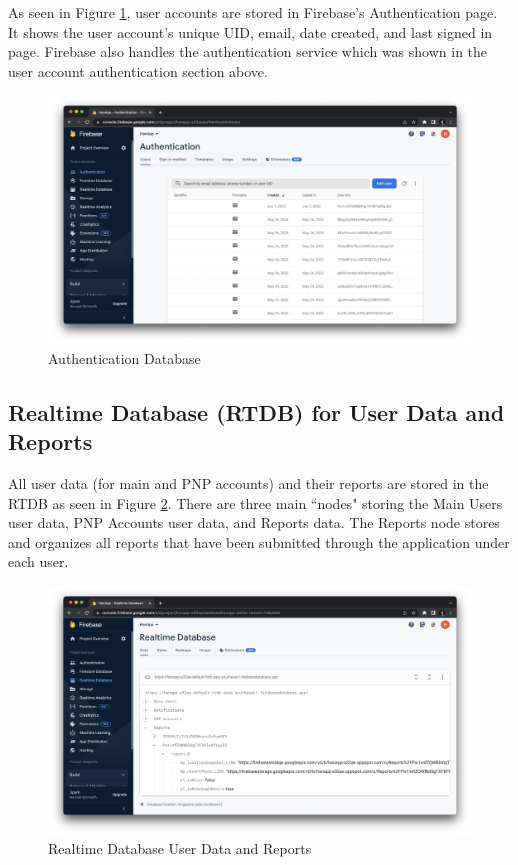 As seen in Figure \ref{fig:firebaseAuth}, user accounts are stored in Firebase's Authentication page. It shows the user account's unique UID, email, date created, and last signed in page. Firebase also handles the authentication service which was shown in the user account authentication section above.
\begin{figure}[!h]
    \centering
    \begin{minipage}[c]{1\linewidth}
        \centering
        \includegraphics[scale=0.25]{figures/Chapter4/Firebase/authentication.png}
        \caption{Authentication Database}
        \label{fig:firebaseAuth}
    \end{minipage}
\end{figure}
\subsection{Realtime Database (RTDB) for User Data and Reports}

All user data (for main and PNP accounts) and their reports are stored in the RTDB as seen in Figure \ref{fig:firebaseRTDB}. There are three main ``nodes" storing the Main Users user data, PNP Accounts user data, and Reports data. The Reports node stores and organizes all reports that have been submitted through the application under each user.
\begin{figure}[!h]
    \centering
    \begin{minipage}[c]{1\linewidth}
        \centering
        \includegraphics[scale=0.25]{figures/Chapter4/Firebase/rtdbReports.png}
        \caption{Realtime Database User Data and Reports}
        \label{fig:firebaseRTDB}
    \end{minipage}
\end{figure}
